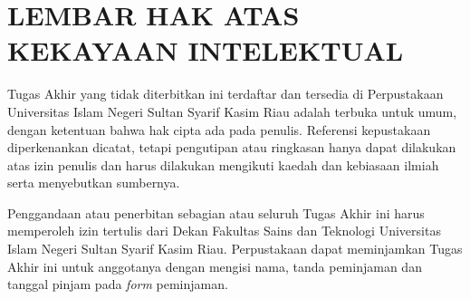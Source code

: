 %
%
%
%


\chapter*{LEMBAR HAK ATAS KEKAYAAN INTELEKTUAL}

Tugas Akhir yang tidak diterbitkan ini terdaftar dan tersedia di Perpustakaan Universitas Islam Negeri Sultan Syarif Kasim Riau adalah terbuka untuk umum, dengan ketentuan bahwa hak cipta ada pada penulis. Referensi kepustakaan diperkenankan dicatat, tetapi pengutipan atau ringkasan hanya dapat dilakukan atas izin penulis dan harus dilakukan mengikuti kaedah dan kebiasaan ilmiah serta menyebutkan sumbernya.

Penggandaan atau penerbitan sebagian atau seluruh Tugas Akhir ini harus memperoleh izin tertulis dari Dekan Fakultas Sains dan Teknologi Universitas Islam Negeri Sultan Syarif Kasim Riau. Perpustakaan dapat meminjamkan Tugas Akhir ini untuk anggotanya dengan mengisi nama, tanda peminjaman dan tanggal pinjam pada \emph{form} peminjaman.
